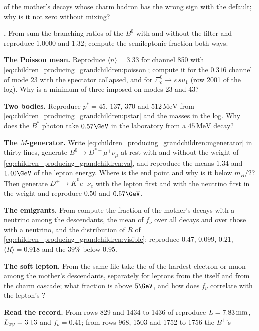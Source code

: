 \begin{exercises}
  of the mother's decays whose charm hadron has the wrong sign with the
  default; why is it not zero without mixing?
\item \textbf{.} From  sum the
  branching ratios of the $B^0$ with and without the  filter
  and reproduce $1.0000$ and $1.32$; compute the semileptonic fraction
  both ways.
\item \textbf{The Poisson mean.} Reproduce $\langle n\rangle=3.33$ for
  channel 850 with \cref{eq:children_producing_grandchildren:poisson};
  compute it for the $0.316$ channel of mode 23 with the spectator
  collapsed, and for $\Xi_c^0\to s\,su_1$ (row 2001 of the log). Why is a
  minimum of three imposed on modes 23 and 43?
\item \textbf{Two bodies.} Reproduce $p^*=45$, $137$, $370$ and $512\,\mathrm{MeV}$
  from \cref{eq:children_producing_grandchildren:pstar} and the masses in
  the log. Why does the $B^*$ photon take $0.57\GeV$ in the laboratory
  from a $45\,\mathrm{MeV}$ decay?
\item \textbf{The $M$-generator.} Write
  \cref{eq:children_producing_grandchildren:mgenerator} in thirty lines,
  generate $B^0\to D^{*-}\mu^+\nu_\mu$ at rest with and without the weight
  of \cref{eq:children_producing_grandchildren:va}, and reproduce the
  means $1.34$ and $1.40\GeV$ of the lepton energy. Where is the end point
  and why is it below $m_B/2$? Then generate $D^+\to\bar K^0e^+\nu_e$
  with the lepton first and with the neutrino first in the weight and
  reproduce $0.50$ and $0.57\GeV$.
\item \textbf{The emigrants.} From 
  compute the fraction of the mother's decays with a neutrino among the
  descendants, the mean of $f_\nu$ over all decays and over those with a
  neutrino, and the distribution of $R$ of
  \cref{eq:children_producing_grandchildren:visible}; reproduce $0.47$,
  $0.099$, $0.21$, $\langle R\rangle=0.918$ and the $39\%$ below $0.95$.
\item \textbf{The soft lepton.} From the same file take the \pt of the
  hardest electron or muon among the mother's descendants, separately for
  leptons from the \Bbar itself and from the charm cascade; what fraction
  is above $5\GeV$, and how does $f_\nu$ correlate with the lepton's \pt?
\item \textbf{Read the \CMSSW record.} From rows 829 and 1434 to 1436 of
   reproduce $L=7.83\,\mathrm{mm}$, $L_{xy}=3.13$ and
  $f_\nu=0.41$; from rows 968, 1503 and 1752 to 1756 the $B^+$'s

\end{exercises}
